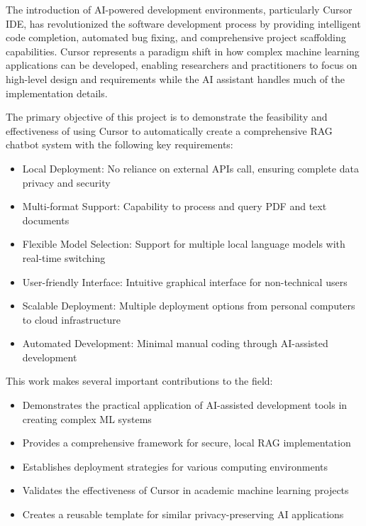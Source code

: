 \documentclass[12pt,letterpaper]{article}
\begin{document}
The introduction of AI-powered development environments, particularly Cursor IDE, has revolutionized the software development process by providing intelligent code completion, automated bug fixing, and comprehensive project scaffolding capabilities. 
Cursor represents a paradigm shift in how complex machine learning applications can be developed, enabling researchers and practitioners to focus on high-level design and requirements while the AI assistant handles much of the implementation details.

The primary objective of this project is to demonstrate the feasibility and effectiveness of using Cursor to automatically create a comprehensive RAG chatbot system with the following key requirements:

\begin{itemize}
    \item Local Deployment: No reliance on external APIs call, ensuring complete data privacy and security
    \item Multi-format Support: Capability to process and query PDF and text documents
    \item Flexible Model Selection: Support for multiple local language models with real-time switching
    \item User-friendly Interface: Intuitive graphical interface for non-technical users
    \item Scalable Deployment: Multiple deployment options from personal computers to cloud infrastructure
    \item Automated Development: Minimal manual coding through AI-assisted development
\end{itemize}

This work makes several important contributions to the field:

\begin{itemize}
    \item Demonstrates the practical application of AI-assisted development tools in creating complex ML systems
    \item Provides a comprehensive framework for secure, local RAG implementation
    \item Establishes deployment strategies for various computing environments
    \item Validates the effectiveness of Cursor in academic machine learning projects
    \item Creates a reusable template for similar privacy-preserving AI applications
\end{itemize}
\end{document}
